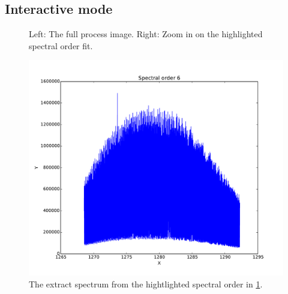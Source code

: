 \subsection{Interactive mode}

\begin{figure}
\begin{center}
\caption{Left: The full process image. Right: Zoom in on the highlighted spectral order fit. \label{figure:cal_extract_RAW_spirou_1}}
\end{center}
\end{figure}

\begin{figure}
\begin{center}
\includegraphics[width=.8\textwidth]{figures/cal_extract_RAW_spirou_2.pdf}
\caption{The extract spectrum from the hightlighted spectral order in \protect\ref{figure:cal_extract_RAW_spirou_1}. \label{figure:cal_extract_RAW_spirou_2}}
\end{center}
\end{figure}

